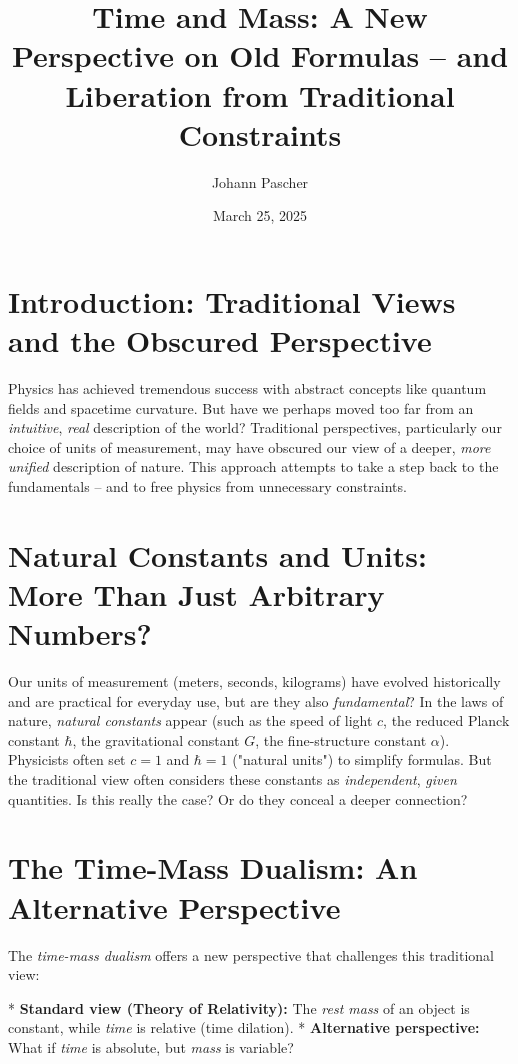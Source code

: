 \documentclass[a4paper,12pt]{article}
\title{Time and Mass: A New Perspective on Old Formulas – and Liberation from Traditional Constraints}
\author{Johann Pascher}
\date{March 25, 2025}
\begin{document}
	\maketitle
	
	\section{Introduction: Traditional Views and the Obscured Perspective}
	
	Physics has achieved tremendous success with abstract concepts like quantum fields and spacetime curvature. But have we perhaps moved too far from an \emph{intuitive}, \emph{real} description of the world? Traditional perspectives, particularly our choice of units of measurement, may have obscured our view of a deeper, \emph{more unified} description of nature. This approach attempts to take a step back to the fundamentals – and to free physics from unnecessary constraints.
	
	\section{Natural Constants and Units: More Than Just Arbitrary Numbers?}
	
	Our units of measurement (meters, seconds, kilograms) have evolved historically and are practical for everyday use, but are they also \emph{fundamental}? In the laws of nature, \emph{natural constants} appear (such as the speed of light \(c\), the reduced Planck constant \(\hbar\), the gravitational constant \(G\), the fine-structure constant \(\alpha\)). Physicists often set \(c = 1\) and \(\hbar = 1\) ("natural units") to simplify formulas. But the traditional view often considers these constants as \emph{independent}, \emph{given} quantities. Is this really the case? Or do they conceal a deeper connection?
	
	\section{The Time-Mass Dualism: An Alternative Perspective}
	
	The \emph{time-mass dualism} offers a new perspective that challenges this traditional view:
	
	*   \textbf{Standard view (Theory of Relativity):} The \emph{rest mass} of an object is constant, while \emph{time} is relative (time dilation).
	*   \textbf{Alternative perspective:} What if \emph{time} is absolute, but \emph{mass} is variable?
	
\end{document}

